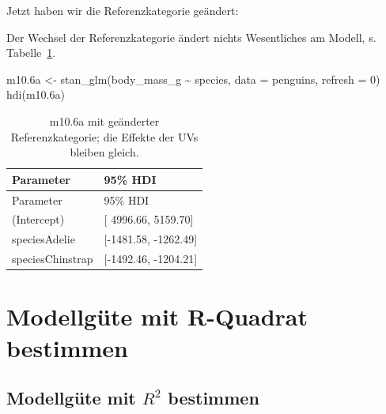 \documentclass[
  a4paper,
  DIV=11]{scrreprt}
\newenvironment{Shaded}{\begin{snugshade}}{\end{snugshade}}
\newcommand{\AttributeTok}[1]{\textcolor[rgb]{0.40,0.45,0.13}{#1}}
\newcommand{\DecValTok}[1]{\textcolor[rgb]{0.68,0.00,0.00}{#1}}
\newcommand{\DocumentationTok}[1]{\textcolor[rgb]{0.37,0.37,0.37}{\textit{#1}}}
\newcommand{\FloatTok}[1]{\textcolor[rgb]{0.68,0.00,0.00}{#1}}
\newcommand{\FunctionTok}[1]{\textcolor[rgb]{0.28,0.35,0.67}{#1}}
\newcommand{\NormalTok}[1]{\textcolor[rgb]{0.00,0.23,0.31}{#1}}
\newcommand{\OtherTok}[1]{\textcolor[rgb]{0.00,0.23,0.31}{#1}}
\newcommand{\SpecialCharTok}[1]{\textcolor[rgb]{0.37,0.37,0.37}{#1}}
\theoremstyle{definition}
\theoremstyle{remark}
\begin{document}
Jetzt haben wir die Referenzkategorie geändert:

\begin{Shaded}
\end{Shaded}

Der Wechsel der Referenzkategorie ändert nichts Wesentliches am Modell,
s. Tabelle~\ref{tbl-m106a}.

\begin{Shaded}
\begin{Highlighting}[]
\NormalTok{m10}\FloatTok{.6}\NormalTok{a }\OtherTok{\textless{}{-}} \FunctionTok{stan\_glm}\NormalTok{(body\_mass\_g }\SpecialCharTok{\textasciitilde{}}\NormalTok{ species, }\AttributeTok{data =}\NormalTok{ penguins, }\AttributeTok{refresh =} \DecValTok{0}\NormalTok{)}
\FunctionTok{hdi}\NormalTok{(m10}\FloatTok{.6}\NormalTok{a)}
\end{Highlighting}
\end{Shaded}

\hypertarget{tbl-m106a}{}
\begin{longtable}[]{@{}ll@{}}
\caption{\label{tbl-m106a}m10.6a mit geänderter Referenzkategorie; die
Effekte der UVs bleiben gleich.}\tabularnewline
\toprule()
Parameter & 95\% HDI \\
\midrule()
\endfirsthead
\toprule()
Parameter & 95\% HDI \\
\midrule()
\endhead
(Intercept) & {[} 4996.66, 5159.70{]} \\
speciesAdelie & {[}-1481.58, -1262.49{]} \\
speciesChinstrap & {[}-1492.46, -1204.21{]} \\
\bottomrule()
\end{longtable}

\hypertarget{modellguxfcte-mit-r-quadrat-bestimmen}{%
\section{Modellgüte mit R-Quadrat
bestimmen}\label{modellguxfcte-mit-r-quadrat-bestimmen}}

\hypertarget{modellguxfcte-mit-r2-bestimmen}{%
\subsection{\texorpdfstring{Modellgüte mit \(R^2\)
bestimmen}{Modellgüte mit R\^{}2 bestimmen}}\label{modellguxfcte-mit-r2-bestimmen}}
\end{document}
